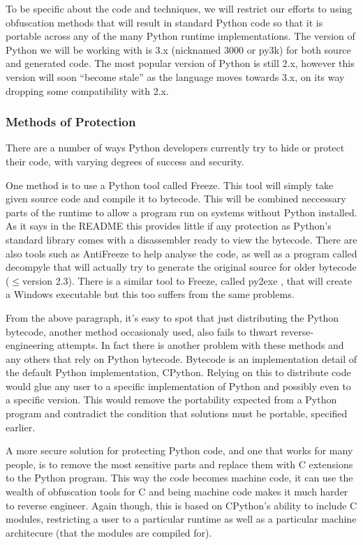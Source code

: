 \documentclass{report}
\begin{document}
To be specific about the code and techniques, we will restrict our efforts to using obfuscation methods that will
result in standard Python code so that it is portable across any of the many Python runtime implementations. The version
of Python we will be working with is 3.x (nicknamed 3000 or py3k) for both source and generated code. The most popular
version of Python is still 2.x, however this version will soon ``become stale'' as the language moves towards 3.x, on its way
dropping some compatibility with 2.x.

\subsubsection{Methods of Protection}

There are a number of ways Python developers currently try to hide or protect their code, with varying degrees
of success and security.

One method is to use a Python tool called Freeze. This tool will simply take given source code and compile
it to bytecode. This will be combined neccessary parts of the runtime to allow a program run
on systems without Python installed. As it says in the README \cite{freezereadme} this provides little if any
protection as Python's standard library comes with a disassembler ready to view the bytecode. There are also
tools such as AntiFreeze \cite{pirates} to help analyse the code, as well as a program called
decompyle \cite{decompyle} that will actually try to generate the original source for older bytecode ($\le$version
2.3). There is a similar tool to Freeze, called py2exe \cite{py2exe}, that will create a Windows executable but
this too suffers from the same problems.

From the above paragraph, it's easy to spot that just distributing the Python bytecode, another method occasionaly
used, also fails to thwart reverse-engineering attempts. In fact there is another problem
with these methods and any others that rely on Python bytecode. Bytecode is an implementation detail \cite{dis}
of the default Python implementation, CPython. Relying on this to distribute code would glue any
user to a specific implementation of Python and possibly even to a specific version. This would remove the portability
expected from a Python program and contradict the condition that solutions must be portable, specified earlier.

A more secure solution for protecting Python code, and one that works for many people, is to remove the most
sensitive parts and replace them with C extensions to the Python program. This way the code becomes machine
code, it can use the wealth of obfuscation tools for C and being machine code makes it much
harder to reverse engineer. Again though, this is based on CPython's ability to include C modules, restricting a
user to a particular runtime as well as a particular machine architecure (that the modules are compiled for).
\end{document}
